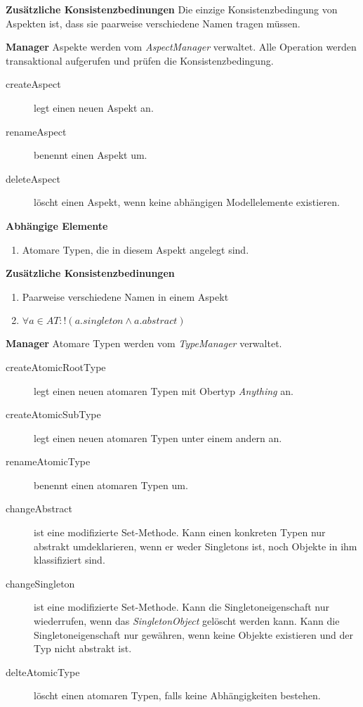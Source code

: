 
\textbf{Zusätzliche Konsistenzbedinungen} \newline
Die einzige Konsistenzbedingung von Aspekten ist, dass sie paarweise verschiedene Namen tragen müssen. 

\textbf{Manager} \newline
Aspekte werden vom \emph{AspectManager} verwaltet. Alle Operation werden transaktional aufgerufen und prüfen die Konsistenzbedingung. 

\begin{description}
\item[createAspect] legt einen neuen Aspekt an.
\item[renameAspect] benennt einen Aspekt um.
\item[deleteAspect] löscht einen Aspekt, wenn keine abhängigen Modellelemente existieren.
\end{description}

\textbf{Abhängige Elemente}
\begin{enumerate}
  		\item Atomare Typen, die in diesem Aspekt angelegt sind.
\end{enumerate}



\textbf{Zusätzliche Konsistenzbedinungen}
\begin{enumerate}
  		\item Paarweise verschiedene Namen in einem Aspekt
  		\item \(\forall a \in AT : !(a.singleton \land a.abstract) \)
\end{enumerate}

\textbf{Manager} \newline
Atomare Typen werden vom \emph{TypeManager} verwaltet. 

\begin{description}
\item[createAtomicRootType] legt einen neuen atomaren Typen mit Obertyp \emph{Anything} an. 
\item[createAtomicSubType] legt einen neuen atomaren Typen unter einem andern an. 
\item[renameAtomicType] benennt einen atomaren Typen um. 
\item[changeAbstract] ist eine modifizierte Set-Methode. Kann einen konkreten Typen nur abstrakt umdeklarieren, wenn er weder Singletons ist, noch 
Objekte in ihm klassifiziert sind.
\item[changeSingleton] ist eine modifizierte Set-Methode. Kann die Singletoneigenschaft nur wiederrufen, wenn das \emph{SingletonObject} gelöscht werden kann. 
 Kann die Singletoneigenschaft nur gewähren, wenn keine Objekte existieren und der Typ nicht abstrakt ist. 
 \item[delteAtomicType] löscht einen atomaren Typen, falls keine Abhängigkeiten bestehen.
\end{description}

